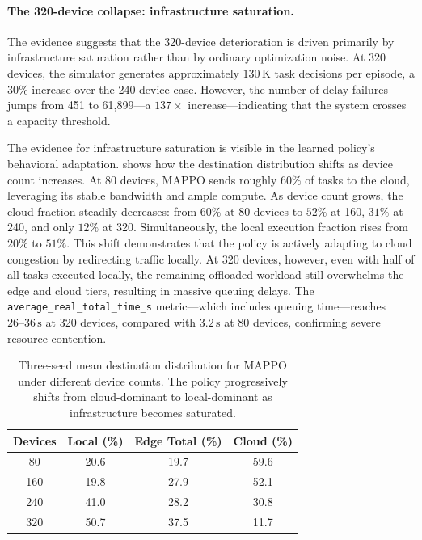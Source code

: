 \paragraph{The 320-device collapse: infrastructure saturation.}
The evidence suggests that the 320-device deterioration is driven primarily by infrastructure saturation rather than by ordinary optimization noise. At 320 devices, the simulator generates approximately \(130\,\mathrm{K}\) task decisions per episode, a \(30\%\) increase over the 240-device case. However, the number of delay failures jumps from 451 to 61,899---a \(137\times\) increase---indicating that the system crosses a capacity threshold.

The evidence for infrastructure saturation is visible in the learned policy's behavioral adaptation.  shows how the destination distribution shifts as device count increases. At 80 devices, MAPPO sends roughly \(60\%\) of tasks to the cloud, leveraging its stable bandwidth and ample compute. As device count grows, the cloud fraction steadily decreases: from \(60\%\) at 80 devices to \(52\%\) at 160, \(31\%\) at 240, and only \(12\%\) at 320. Simultaneously, the local execution fraction rises from \(20\%\) to \(51\%\). This shift demonstrates that the policy is actively adapting to cloud congestion by redirecting traffic locally. At 320 devices, however, even with half of all tasks executed locally, the remaining offloaded workload still overwhelms the edge and cloud tiers, resulting in massive queuing delays. The \texttt{average\_real\_total\_time\_s} metric---which includes queuing time---reaches \(26\text{--}36\,\mathrm{s}\) at 320 devices, compared with \(3.2\,\mathrm{s}\) at 80 devices, confirming severe resource contention.

\begin{table}[h]
    \centering
    \small
    \begin{tabular}{c|ccc}
        \hline
        \textbf{Devices} & \textbf{Local (\%)} & \textbf{Edge Total (\%)} & \textbf{Cloud (\%)} \\
        \hline
        80  & 20.6 & 19.7 & 59.6 \\
        160 & 19.8 & 27.9 & 52.1 \\
        240 & 41.0 & 28.2 & 30.8 \\
        320 & 50.7 & 37.5 & 11.7 \\
        \hline
    \end{tabular}
    \caption{Three-seed mean destination distribution for MAPPO under different device counts. The policy progressively shifts from cloud-dominant to local-dominant as infrastructure becomes saturated.}
    \label{tab:ablation-devices-destination}
\end{table}

